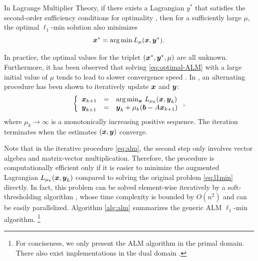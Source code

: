 \documentclass[10pt,twocolumn,letterpaper]{article}
\begin{document}
In Lagrange Multiplier Theory, if there exists a Lagrangian $y^*$ that
satisfies the second-order sufficiency conditions for optimality
\cite{BertsekasD2003}, then for a sufficiently large $\mu$, the optimal
$\ell_1$-min solution also minimizes
\begin{equation}
{\boldsymbol{x}}^* = \arg \min L_\mu({\boldsymbol{x}},{\boldsymbol{y}}^*).
\label{eq:optimal-ALM}
\end{equation}

In practice, the optimal values for the triplet $({\boldsymbol{x}}^*, {\boldsymbol{y}}^*, \mu)$ are all
unknown. Furthermore, it has been observed that solving
\eqref{eq:optimal-ALM} with a large initial value of $\mu$ tends to lead to
slower convergence speed \cite{WrightS2008,YangA2010-ICIP}. In
\cite{BertsekasD2003,YangJ2009}, an alternating procedure has been shown to
iteratively update ${\boldsymbol{x}}$ and ${\boldsymbol{y}}$:
\begin{equation}
\left \{
\begin{array}{lll}
{\boldsymbol{x}}_{k+1} & = & \arg\min_{{\boldsymbol{x}}} \, L_{\mu_k} ({\boldsymbol{x}},{\boldsymbol{y}}_k)\\
{\boldsymbol{y}}_{k+1} & = & {\boldsymbol{y}}_k + \mu_k ({\boldsymbol{b}} - A{\boldsymbol{x}}_{k+1}) \\
\end{array}
\right . ,
\label{eq:alm}
\end{equation}
where $\mu_{k}\rightarrow \infty$ is a monotonically increasing positive sequence.
The iteration terminates when the estimates $({\boldsymbol{x}}, {\boldsymbol{y}})$ converge.

Note that in the iterative procedure \eqref{eq:alm}, the second
step only involves vector algebra and matrix-vector multiplication. Therefore,
the procedure is computationally efficient only if it is easier to minimize the
augmented Lagrangian $L_{\mu_k} ({\boldsymbol{x}},{\boldsymbol{y}}_k)$ compared to solving the original problem
\eqref{eq:l1min} directly. In fact, this problem can be solved element-wise
iteratively by a soft-thresholding algorithm \cite{WrightS2008,BeckA2009},
whose time complexity is bounded by $O(n^2)$ and can be easily parallelized.
Algorithm \ref{alg:alm} summarizes the generic ALM $\ell_1$-min algorithm. \footnote{For conciseness, we
only present the ALM algorithm in the primal domain. There also
exist implementations in the dual domain \cite{YangJ2009,YangA2010-ICIP}.}
\end{document}
